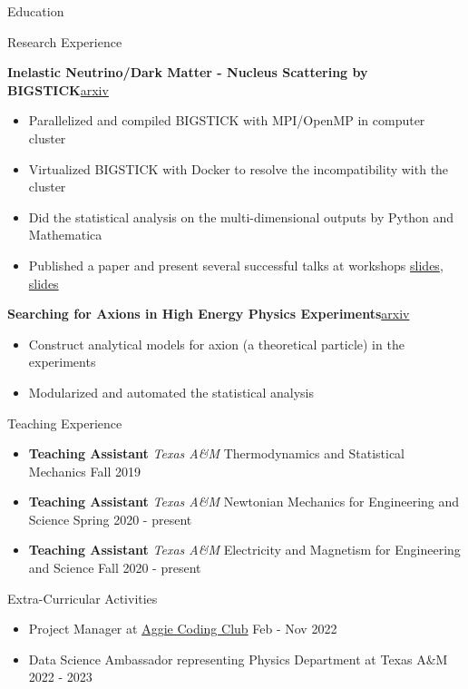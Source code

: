 \documentclass{resume}
\begin{document}
\begin{rSection}{Education}
\begin{rSection}{Research Experience}
\vspace{-1.25em}
\item \textbf{Inelastic Neutrino/Dark Matter - Nucleus Scattering by BIGSTICK}\hfill \href{https://arxiv.org/pdf/2206.08590.pdf}{arxiv}
    \begin{itemize}
    \itemsep -3pt {}
    \item Parallelized and compiled BIGSTICK with MPI/OpenMP in computer cluster
    \item Virtualized BIGSTICK with Docker to resolve the incompatibility with the cluster
    \item Did the statistical analysis on the multi-dimensional outputs by Python and Mathematica
    \item Published a paper and present several successful talks at workshops \href{https://noctildon.github.io/physics/Phenon_2022.pdf}{slides}, \href{https://noctildon.github.io/physics/Plains_2022.pdf}{slides}
    \end{itemize}
\item \textbf{Searching for Axions in High Energy Physics Experiments}\hfill \href{https://arxiv.org/pdf/2207.13659.pdf}{arxiv}
    \begin{itemize}
    \itemsep -3pt {}
    \item Construct analytical models for axion (a theoretical particle) in the experiments
    \item Modularized and automated the statistical analysis
    \end{itemize}
\end{rSection}


\begin{rSection}{Teaching Experience}
    \begin{itemize}
        \item \textbf{Teaching Assistant} {{\it Texas A\&M} Thermodynamics and Statistical Mechanics} \hfill Fall 2019
        \item \textbf{Teaching Assistant} {{\it Texas A\&M} Newtonian Mechanics for Engineering and Science} \hfill Spring 2020 - present
        \item \textbf{Teaching Assistant} {{\it Texas A\&M} Electricity and Magnetism for Engineering and Science} \hfill Fall 2020 - present
    \end{itemize}
\end{rSection}


\begin{rSection}{Extra-Curricular Activities}
\begin{itemize}
    \item Project Manager at \href{https://aggiecodingclub.com/}{Aggie Coding Club} \hfill Feb - Nov 2022
    \item Data Science Ambassador representing Physics Department at Texas A\&M \hfill 2022 - 2023
\end{itemize}
\end{rSection}



\end{rSection}
\end{document}
